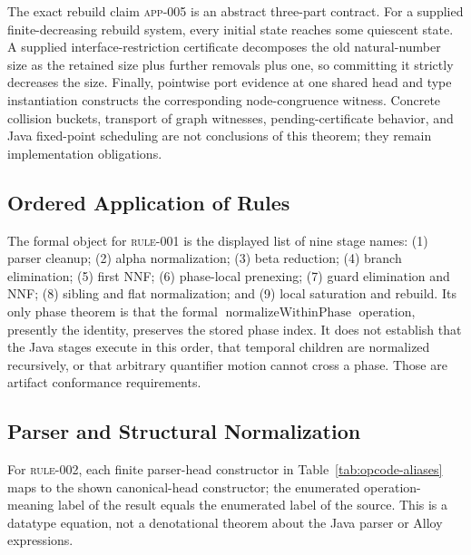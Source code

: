The exact rebuild claim \textsc{app-005} is an abstract three-part contract.
For a supplied finite-decreasing rebuild system, every initial state reaches
some quiescent state.  A supplied interface-restriction certificate decomposes
the old natural-number size as the retained size plus further removals plus
one, so committing it strictly decreases the size.  Finally, pointwise port
evidence at one shared head and type instantiation constructs the corresponding
node-congruence witness.  Concrete collision buckets, transport of graph
witnesses, pending-certificate behavior, and Java fixed-point scheduling are
not conclusions of this theorem; they remain implementation obligations.

\subsection{Ordered Application of Rules}
\label{app:rule-order}

The formal object for \textsc{rule-001} is the displayed list of nine stage
names: (1) parser cleanup; (2) alpha normalization; (3) beta reduction;
(4) branch elimination; (5) first NNF; (6) phase-local prenexing; (7) guard
elimination and NNF; (8) sibling and flat normalization; and (9) local
saturation and rebuild.  Its only phase theorem is that the formal
$\operatorname{normalizeWithinPhase}$ operation, presently the identity,
preserves the stored phase index.  It does not establish that the Java stages
execute in this order, that temporal children are normalized recursively, or
that arbitrary quantifier motion cannot cross a phase.  Those are artifact
conformance requirements.

\subsection{Parser and Structural Normalization}

For \textsc{rule-002}, each finite parser-head constructor in
Table~\ref{tab:opcode-aliases} maps to the shown canonical-head constructor;
the enumerated operation-meaning label of the result equals the enumerated
label of the source.  This is a datatype equation, not a denotational theorem
about the Java parser or Alloy expressions.

